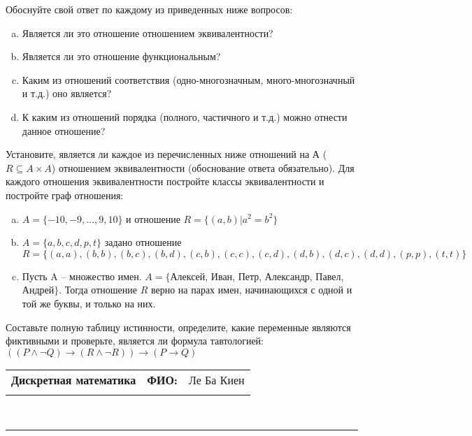\documentclass[10pt]{exam}
\newcommand{\class}{Дискретная математика}
\newcommand{\examdate}{}
\begin{document}
\begin{questions}
Обоснуйте свой ответ по каждому из приведенных ниже вопросов:
\begin{enumerate} [a)]\setcounter{enumi}{0}
    \item Является ли это отношение отношением эквивалентности?
    \item Является ли это отношение функциональным?
    \item Каким из отношений соответствия (одно-многозначным, много-многозначный и т.д.) оно является?
    \item К каким из отношений порядка (полного, частичного и т.д.) можно отнести данное отношение?
\end{enumerate}
\question
Установите, является ли каждое из перечисленных ниже отношений на А ($R \subseteq A \times A$) отношением эквивалентности (обоснование ответа обязательно). Для каждого отношения эквивалентности постройте классы 
эквивалентности и постройте граф отношения:
\begin{enumerate} [a)]\setcounter{enumi}{0}
\item $A = \{-10, -9, … , 9, 10\}$ и отношение $R = \{(a,b)|a^{2} = b^{2}\}$
\item $A = \{a, b, c, d, p, t\}$ задано отношение $R = \{(a, a), (b, b), (b, c), (b, d), (c, b), (c, c), (c, d), (d, b), (d, c), (d, d), (p,p), (t,t)\}$
\item Пусть A – множество имен. $A = \{ $Алексей, Иван, Петр, Александр, Павел, Андрей$ \}$. Тогда отношение $R$ верно на парах имен, начинающихся с одной и той же буквы, и только на них.
\end{enumerate}\question Составьте полную таблицу истинности, определите, какие переменные являются фиктивными и проверьте, является ли формула тавтологией:
$(( P \land \neg Q) \rightarrow (R \land \neg R)) \rightarrow (P \rightarrow Q)$

\end{questions}
\newpage
\begin{flushright}
\begin{tabular}{p{2.8in} r l}
\textbf{\class} & \textbf{ФИО:} &Ле Ба Киен
\\

\textbf{\examdate} &&\\
\end{tabular}\\
\end{flushright}
\rule[1ex]{\textwidth}{.1pt}
\end{document}
